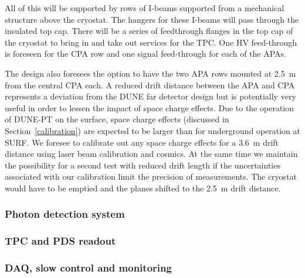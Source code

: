 All of this will be supported by rows of I-beams supported from a mechanical structure above the cryostat.  The hangers for these I-beams will pass through the insulated top cap.  There will be a series of feedthrough flanges in the top cap of the cryostat to bring in and take out services for the TPC.  One HV feed-through is foreseen for the CPA row and one signal feed-through for each of the APAs.

The design also foresees the option to have the two APA rows mounted at 2.5~m from the central CPA each.
A reduced drift distance between the APA and CPA represents a deviation from the DUNE far detector design but is potentially very
useful in order to lessen the impact of space charge effects.
Due to the operation of DUNE-PT on the surface, space charge 
 effects (discussed in Section~\ref{calibration}) are expected to be larger than for underground operation at SURF.
We foresee to calibrate out any space charge effects for a 3.6~m drift distance using laser beam calibration and cosmics. 
At the same time we maintain the  possibility for a second test with reduced drift length if the uncertainties associated 
with our calibration limit the precision of measurements.
The cryostat would have to be emptied and the planes shifted to the 2.5~m drift distance.
 









\subsubsection{Photon detection system}


\subsubsection{TPC and PDS readout}


\subsubsection{DAQ, slow control and monitoring}





